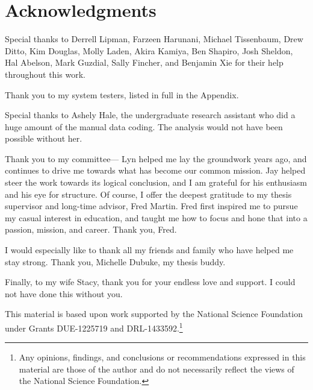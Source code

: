 \chapter*{Acknowledgments}
\renewcommand{\thefootnote}{\fnsymbol{footnote}}


Special thanks to Derrell Lipman, Farzeen Harunani, Michael Tissenbaum, Drew Ditto, Kim Douglas, Molly Laden, Akira Kamiya, Ben Shapiro, Josh Sheldon, Hal Abelson, Mark Guzdial, Sally Fincher, and Benjamin Xie for their help throughout this work.

Thank you to my system testers, listed in full in the Appendix.


Special thanks to Ashely Hale, the undergraduate research assistant who did a huge amount of the manual data coding. The analysis would not have been possible without her.

Thank you to my committee--- Lyn helped me lay the groundwork years ago, and continues to drive me towards what has become our common mission. Jay helped steer the work towards its logical conclusion, and I am grateful for his enthusiasm and his eye for structure. Of course, I offer the deepest gratitude to my thesis supervisor and long-time advisor, Fred Martin. Fred first inspired me to pursue my casual interest in education, and taught me how to focus and hone that into a passion, mission, and career. Thank you, Fred. 

I would especially like to thank all my friends and family who have helped me stay strong. Thank you, Michelle Dubuke, my thesis buddy.

Finally, to my wife Stacy, thank you for your endless love and support. I could not have done this without you.


This material is based upon work supported by the National Science Foundation under Grants DUE-1225719 and DRL-1433592.\footnote{Any opinions, findings, and conclusions or recommendations expressed in this material are those of the author and do not necessarily reflect the views of the National Science Foundation.}

\renewcommand{\thefootnote}{\arabic{footnote}}